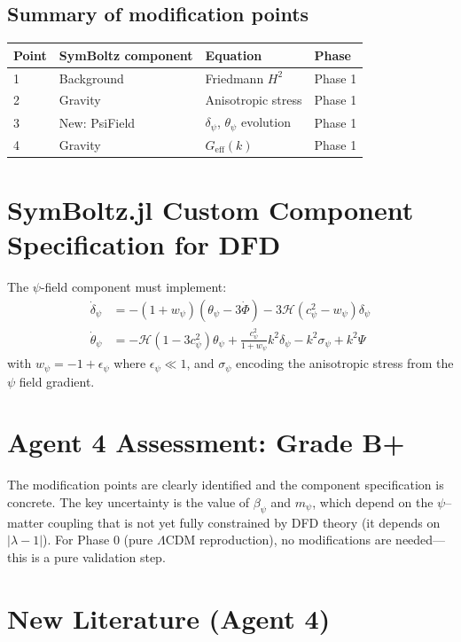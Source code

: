 \documentclass[11pt,a4paper]{article}
\begin{document}
\subsection{Summary of modification points}

\begin{center}
\begin{tabular}{llll}
\toprule
\textbf{Point} & \textbf{SymBoltz component} & \textbf{Equation} & \textbf{Phase} \\
\midrule
1 & Background & Friedmann $H^2$ & Phase 1 \\
2 & Gravity & Anisotropic stress & Phase 1 \\
3 & New: PsiField & $\delta_\psi$, $\theta_\psi$ evolution & Phase 1 \\
4 & Gravity & $G_{\text{eff}}(k)$ & Phase 1 \\
\bottomrule
\end{tabular}
\end{center}

\section{SymBoltz.jl Custom Component Specification for DFD}

The $\psi$-field component must implement:
\begin{align}
\dot{\delta}_\psi &= -(1+w_\psi)(\theta_\psi - 3\dot{\Phi}) - 3\mathcal{H}\left(c_\psi^2 - w_\psi\right)\delta_\psi \\
\dot{\theta}_\psi &= -\mathcal{H}(1-3c_\psi^2)\theta_\psi + \frac{c_\psi^2}{1+w_\psi}k^2\delta_\psi - k^2\sigma_\psi + k^2\Psi
\end{align}
with $w_\psi = -1 + \epsilon_\psi$ where $\epsilon_\psi \ll 1$, and $\sigma_\psi$ encoding the anisotropic stress from the $\psi$ field gradient.

\section{Agent 4 Assessment: Grade B+}

The modification points are clearly identified and the component specification is concrete. The key uncertainty is the value of $\beta_\psi$ and $m_\psi$, which depend on the $\psi$--matter coupling that is not yet fully constrained by DFD theory (it depends on $|\lambda - 1|$). For Phase 0 (pure $\Lambda$CDM reproduction), no modifications are needed---this is a pure validation step.

\section{New Literature (Agent 4)}
\end{document}
